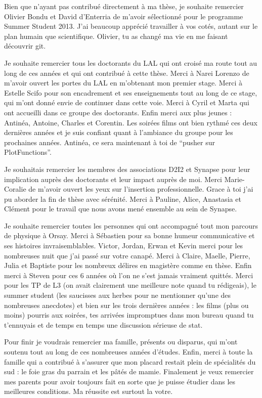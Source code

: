 Bien que n'ayant pas contribué directement à ma thèse, je souhaite remercier Olivier Bondu et David d'Enterria de m'avoir sélectionné pour le programme Summer Student 2013.
J'ai beaucoup apprécié travailler à vos cotés, autant sur le plan humain que scientifique.
Olivier, tu as changé ma vie en me faisant découvrir git.

Je souhaite remercier tous les doctorants du LAL qui ont croisé ma route tout au long de ces années et qui ont contribué à cette thèse.
Merci à Narei Lorenzo de m'avoir ouvert les portes du LAL en m'obtenant mon premier stage.
Merci à Estelle Scifo pour son encadrement et ses enseignements tout au long de ce stage, qui m'ont donné envie de continuer dans cette voie.
Merci à Cyril et Marta qui ont accueilli dans ce groupe des doctorants.
Enfin merci aux plus jeunes : Antinéa, Antoine, Charles et Corentin.
Les soirées films ont bien rythmé ces deux dernières années et je suis confiant quant à l'ambiance du groupe pour les prochaines années.
Antinéa, ce sera maintenant à toi de ``pusher sur PlotFunctions''.


Je souhaitais remercier les membres des associations D2I2 et Synapse pour leur implication auprès des doctorants et leur impact auprès de moi.
Merci Marie-Coralie de m'avoir ouvert les yeux sur l'insertion professionnelle.
Grace à toi j'ai pu aborder la fin de thèse avec sérénité.
Merci à Pauline, Alice, Anastasia et Clément pour le travail que nous avons mené ensemble au sein de Synapse.


Je souhaite remercier toutes les personnes qui ont accompagné tout mon parcours de physique à Orsay.
Merci à Sébastien pour sa bonne humeur communicative et ses histoires invraisemblables.
Victor, Jordan, Erwan et Kevin merci pour les nombreuses nuit que j'ai passé sur votre canapé.
Merci à Claire, Maelle, Pierre, Julia et Baptiste pour les nombreux délires en magistère comme en thèse.
Enfin merci à Steven pour ces 6 années où l'on ne s'est jamais vraiment quittés.
Merci pour les TP de L3 (on avait clairement une meilleure note quand tu rédigeais), le summer student (les saucisses aux herbes pour ne mentionner qu'une des nombreuses anecdotes) et bien sur les trois dernières années : les films (plus ou moins) pourris aux soirées, tes arrivées impromptues dans mon bureau quand tu t'ennuyais et de temps en temps une discussion sérieuse de stat.

Pour finir je voudrais remercier ma famille, présents ou disparus,  qui m'ont soutenu tout au long de ces nombreuses années d'études.
Enfin, merci à toute la famille qui a contribué à s'assurer que mon placard restait plein de spécialités du sud : le foie gras du parrain et les pâtés de mamie.
Finalement je veux remercier mes parents pour avoir toujours fait en sorte que je puisse étudier dans les meilleures conditions.
Ma réussite est surtout la votre.



